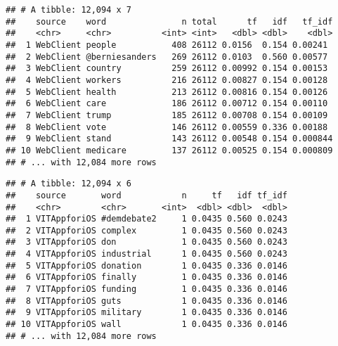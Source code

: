 \documentclass[]{article}
\newenvironment{Shaded}{\begin{snugshade}}{\end{snugshade}}
\newcommand{\KeywordTok}[1]{\textcolor[rgb]{0.13,0.29,0.53}{\textbf{#1}}}
\newcommand{\NormalTok}[1]{#1}
\newcommand{\OperatorTok}[1]{\textcolor[rgb]{0.81,0.36,0.00}{\textbf{#1}}}
\newcommand{\StringTok}[1]{\textcolor[rgb]{0.31,0.60,0.02}{#1}}
\begin{document}
\begin{Shaded}
\end{Shaded}

\begin{verbatim}
## # A tibble: 12,094 x 7
##    source    word               n total      tf   idf   tf_idf
##    <chr>     <chr>          <int> <int>   <dbl> <dbl>    <dbl>
##  1 WebClient people           408 26112 0.0156  0.154 0.00241 
##  2 WebClient @berniesanders   269 26112 0.0103  0.560 0.00577 
##  3 WebClient country          259 26112 0.00992 0.154 0.00153 
##  4 WebClient workers          216 26112 0.00827 0.154 0.00128 
##  5 WebClient health           213 26112 0.00816 0.154 0.00126 
##  6 WebClient care             186 26112 0.00712 0.154 0.00110 
##  7 WebClient trump            185 26112 0.00708 0.154 0.00109 
##  8 WebClient vote             146 26112 0.00559 0.336 0.00188 
##  9 WebClient stand            143 26112 0.00548 0.154 0.000844
## 10 WebClient medicare         137 26112 0.00525 0.154 0.000809
## # ... with 12,084 more rows
\end{verbatim}

\begin{Shaded}
\end{Shaded}

\begin{verbatim}
## # A tibble: 12,094 x 6
##    source       word            n     tf   idf tf_idf
##    <chr>        <chr>       <int>  <dbl> <dbl>  <dbl>
##  1 VITAppforiOS #demdebate2     1 0.0435 0.560 0.0243
##  2 VITAppforiOS complex         1 0.0435 0.560 0.0243
##  3 VITAppforiOS don             1 0.0435 0.560 0.0243
##  4 VITAppforiOS industrial      1 0.0435 0.560 0.0243
##  5 VITAppforiOS donation        1 0.0435 0.336 0.0146
##  6 VITAppforiOS finally         1 0.0435 0.336 0.0146
##  7 VITAppforiOS funding         1 0.0435 0.336 0.0146
##  8 VITAppforiOS guts            1 0.0435 0.336 0.0146
##  9 VITAppforiOS military        1 0.0435 0.336 0.0146
## 10 VITAppforiOS wall            1 0.0435 0.336 0.0146
## # ... with 12,084 more rows
\end{verbatim}
\end{document}
